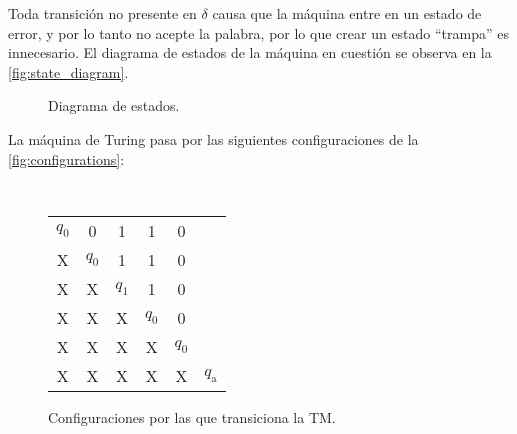 \documentclass{article}
\newcommand{\blank}{\text{\tt \textvisiblespace}}
\theoremstyle{definition}
\begin{document}
Toda transición no presente en $\delta$ causa que la máquina entre en un estado
de error, y por lo tanto no acepte la palabra, por lo que crear un estado
\enquote{trampa} es innecesario. El diagrama de estados de la máquina en cuestión se observa en la \autoref{fig:state_diagram}.

\begin{figure}[ht] %
\centering %
\caption{Diagrama de estados.}\label{fig:state_diagram}
\end{figure}

La máquina de Turing pasa por las siguientes configuraciones de la
\autoref{fig:configurations}:

\begin{figure}[ht] %
\centering %
{%
\setlength\tabcolsep{0mm}
\tt
 \begin{tabular}{cccccc}
   $q_0$ & 0   & 1 & 1 & 0 & \blank \\
   X   & $q_0$ & 1 & 1 & 0 & \blank \\
   X   & X & $q_1$ & 1 & 0 & \blank \\
   X   & X & X & $q_0$ & 0 & \blank \\
   X   & X & X & X & $q_0$ & \blank \\
   X   & X & X & X & X & $q_{\text{a}}$\\
 \end{tabular}
 }
\caption{Configuraciones por las que transiciona la TM.}\label{fig:configurations}
 \end{figure}
\end{document}
